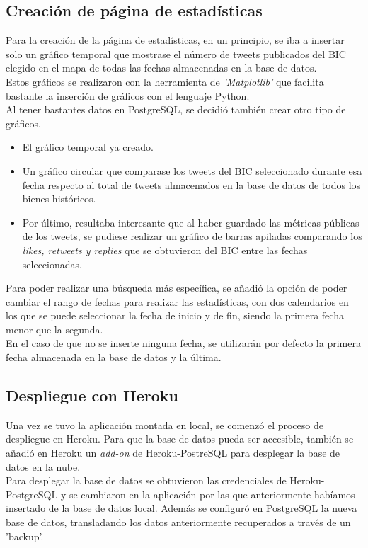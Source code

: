 \subsection{Creación de página de estadísticas}
Para la creación de la página de estadísticas, en un principio, se iba a insertar solo un gráfico temporal que mostrase el número de tweets publicados del BIC elegido en el mapa de todas las fechas almacenadas en la base de datos. \\
Estos gráficos se realizaron con la herramienta de \textit{'Matplotlib'} que facilita bastante la inserción de gráficos con el lenguaje Python.\\
Al tener bastantes datos en PostgreSQL, se decidió también crear otro tipo de gráficos. 
\begin{itemize}
    \item El gráfico temporal ya creado.
    \item Un gráfico circular que comparase los tweets del BIC seleccionado durante esa fecha respecto al total de tweets almacenados en la base de datos de todos los bienes históricos.
    \item Por último, resultaba interesante que al haber guardado las métricas públicas de los tweets, se pudiese realizar un gráfico de barras apiladas comparando los \textit{likes, retweets y replies} que se obtuvieron del BIC entre las fechas seleccionadas.
\end{itemize} 
Para poder realizar una búsqueda más específica, se añadió la opción de poder cambiar el rango de fechas para realizar las estadísticas, con dos calendarios en los que se puede seleccionar la fecha de inicio y de fin, siendo la primera fecha menor que la segunda.\\
En el caso de que no se inserte ninguna fecha, se utilizarán por defecto la primera fecha almacenada en la base de datos y la última.
\subsection{Despliegue con  Heroku}
Una vez se tuvo la aplicación montada en local, se comenzó el proceso de despliegue en Heroku. Para que la base de datos pueda ser accesible, también se añadió en Heroku un \textit{add-on} de Heroku-PostreSQL para desplegar la base de datos en la nube.\\
Para desplegar la base de datos se obtuvieron las credenciales de Heroku-PostgreSQL y se cambiaron en la aplicación por las que anteriormente habíamos insertado de la base de datos local. Además se configuró en PostgreSQL la nueva base de datos, transladando los datos anteriormente recuperados a través de un 'backup'.
